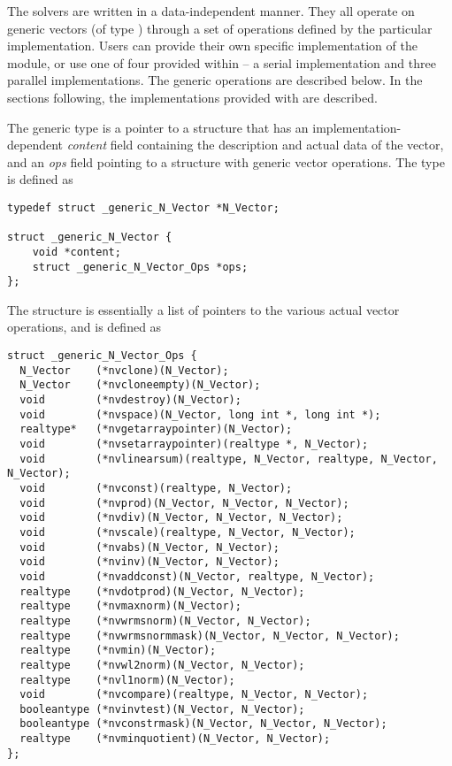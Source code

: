 %
The {\sundials} solvers are written in a data-independent manner. 
They all operate on generic vectors (of type ) through a set of
operations defined by the particular {\nvector} implementation.
Users can provide their own specific implementation of the {\nvector} module,
or use one of four provided within {\sundials} -- a serial implementation and
three parallel implementations.  The generic operations are described below.
In the sections following, the implementations provided with {\sundials}
are described.

The generic  type is a pointer to a structure that has an 
implementation-dependent {\em content} field containing the 
description and actual data of the vector, and an {\em ops} field 
pointing to a structure with generic vector operations.
The type  is defined as
\begin{verbatim}
typedef struct _generic_N_Vector *N_Vector;

struct _generic_N_Vector {
    void *content;
    struct _generic_N_Vector_Ops *ops;
};
\end{verbatim}
The  structure is essentially a list of pointers to
the various actual vector operations, and is defined as
\begin{verbatim}
struct _generic_N_Vector_Ops {
  N_Vector    (*nvclone)(N_Vector);
  N_Vector    (*nvcloneempty)(N_Vector);
  void        (*nvdestroy)(N_Vector);
  void        (*nvspace)(N_Vector, long int *, long int *);
  realtype*   (*nvgetarraypointer)(N_Vector);
  void        (*nvsetarraypointer)(realtype *, N_Vector);
  void        (*nvlinearsum)(realtype, N_Vector, realtype, N_Vector, N_Vector); 
  void        (*nvconst)(realtype, N_Vector);
  void        (*nvprod)(N_Vector, N_Vector, N_Vector);
  void        (*nvdiv)(N_Vector, N_Vector, N_Vector);
  void        (*nvscale)(realtype, N_Vector, N_Vector);
  void        (*nvabs)(N_Vector, N_Vector);
  void        (*nvinv)(N_Vector, N_Vector);
  void        (*nvaddconst)(N_Vector, realtype, N_Vector);
  realtype    (*nvdotprod)(N_Vector, N_Vector);
  realtype    (*nvmaxnorm)(N_Vector);
  realtype    (*nvwrmsnorm)(N_Vector, N_Vector);
  realtype    (*nvwrmsnormmask)(N_Vector, N_Vector, N_Vector);
  realtype    (*nvmin)(N_Vector);
  realtype    (*nvwl2norm)(N_Vector, N_Vector);
  realtype    (*nvl1norm)(N_Vector);
  void        (*nvcompare)(realtype, N_Vector, N_Vector);
  booleantype (*nvinvtest)(N_Vector, N_Vector);
  booleantype (*nvconstrmask)(N_Vector, N_Vector, N_Vector);
  realtype    (*nvminquotient)(N_Vector, N_Vector);
};
\end{verbatim}




